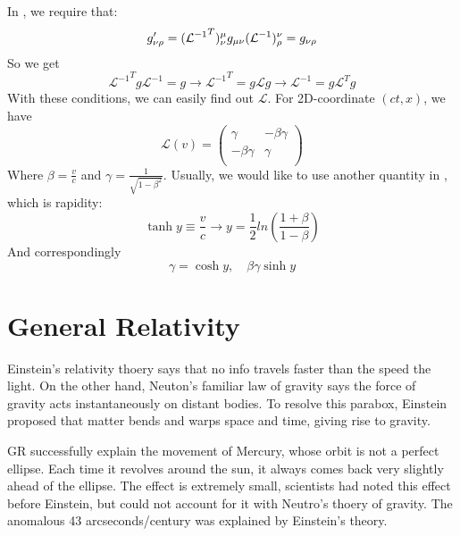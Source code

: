 In \SR{}, we require that:
\[
    g'_{\nu\rho}=({\mathcal{L}^{-1}}^T)_\nu^{\mu}g_{\mu\nu}(\mathcal{L}^{-1})^\nu_{\rho}=g_{\nu\rho}
\]
So we get
\[
    {\mathcal{L}^{-1}}^Tg\mathcal{L}^{-1}=g \rightarrow {\mathcal{L}^{-1}}^T=g\mathcal{L}g \rightarrow \mathcal{L}^{-1}=g\mathcal{L}^Tg
\]
With these conditions, we can easily find out $\mathcal{L}$. For 2D-coordinate $(ct, x)$, we have
\[
    \mathcal{L}(v) = 
	\begin{pmatrix}
	    \gamma  &	-\beta\gamma	\\
	    -\beta\gamma    & \gamma	\\
	\end{pmatrix}
\]
Where $\beta=\frac{v}{c}$ and $\gamma=\frac{1}{\sqrt{1-\beta^2}}$. 
Usually, we would like to use another quantity in \SR{}, which is rapidity:
\[
    \tanh{y}\equiv\frac{v}{c} \rightarrow y=\frac{1}{2}ln(\frac{1+\beta}{1-\beta})
\]
And correspondingly
\[
    \gamma=\cosh{y}, \quad \beta\gamma\sinh{y}
\]



\section{General Relativity}
Einstein's relativity thoery says that no info travels faster than the speed the light. 
On the other hand, Neuton's familiar law of gravity says the force of gravity
acts instantaneously on distant bodies. To resolve this parabox, Einstein 
proposed that matter bends and warps space and time, giving rise to gravity. 

GR successfully explain the movement of Mercury, whose orbit is not a perfect ellipse.
Each time it revolves around the sun, it always comes back very slightly ahead of 
the ellipse. The effect is extremely small, scientists had noted this effect
before Einstein, but could not account for it with Neutro's thoery of gravity. The
anomalous 43 arcseconds/century was explained by Einstein's theory.

